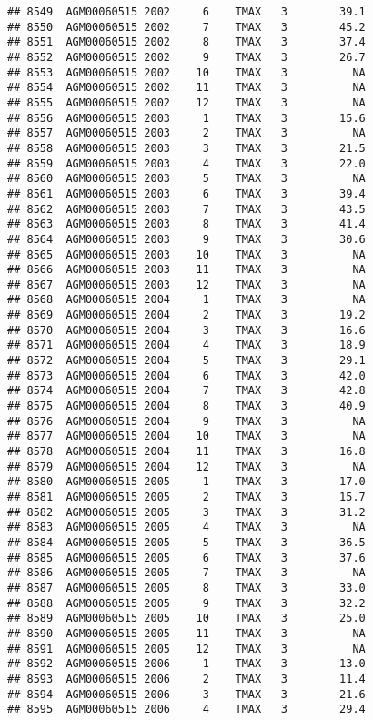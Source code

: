 \documentclass{article}\usepackage[]{graphicx}\usepackage[]{color}
\makeatletter
\newenvironment{kframe}{%
 \def\at@end@of@kframe{}%
 \ifinner\ifhmode%
  \def\at@end@of@kframe{\end{minipage}}%
  \begin{minipage}{\columnwidth}%
 \fi\fi%
 \def\FrameCommand##1{\hskip\@totalleftmargin \hskip-\fboxsep
 \colorbox{shadecolor}{##1}\hskip-\fboxsep
     \hskip-\linewidth \hskip-\@totalleftmargin \hskip\columnwidth}%
 \MakeFramed {\advance\hsize-\width
   \@totalleftmargin\z@ \linewidth\hsize
   \@setminipage}}%
 {\par\unskip\endMakeFramed%
 \at@end@of@kframe}
\newenvironment{knitrout}{}{} %
\makeatother
\begin{document}
\begin{knitrout}
\begin{kframe}
\begin{verbatim}
## 8549  AGM00060515 2002     6    TMAX   3        39.1
## 8550  AGM00060515 2002     7    TMAX   3        45.2
## 8551  AGM00060515 2002     8    TMAX   3        37.4
## 8552  AGM00060515 2002     9    TMAX   3        26.7
## 8553  AGM00060515 2002    10    TMAX   3          NA
## 8554  AGM00060515 2002    11    TMAX   3          NA
## 8555  AGM00060515 2002    12    TMAX   3          NA
## 8556  AGM00060515 2003     1    TMAX   3        15.6
## 8557  AGM00060515 2003     2    TMAX   3          NA
## 8558  AGM00060515 2003     3    TMAX   3        21.5
## 8559  AGM00060515 2003     4    TMAX   3        22.0
## 8560  AGM00060515 2003     5    TMAX   3          NA
## 8561  AGM00060515 2003     6    TMAX   3        39.4
## 8562  AGM00060515 2003     7    TMAX   3        43.5
## 8563  AGM00060515 2003     8    TMAX   3        41.4
## 8564  AGM00060515 2003     9    TMAX   3        30.6
## 8565  AGM00060515 2003    10    TMAX   3          NA
## 8566  AGM00060515 2003    11    TMAX   3          NA
## 8567  AGM00060515 2003    12    TMAX   3          NA
## 8568  AGM00060515 2004     1    TMAX   3          NA
## 8569  AGM00060515 2004     2    TMAX   3        19.2
## 8570  AGM00060515 2004     3    TMAX   3        16.6
## 8571  AGM00060515 2004     4    TMAX   3        18.9
## 8572  AGM00060515 2004     5    TMAX   3        29.1
## 8573  AGM00060515 2004     6    TMAX   3        42.0
## 8574  AGM00060515 2004     7    TMAX   3        42.8
## 8575  AGM00060515 2004     8    TMAX   3        40.9
## 8576  AGM00060515 2004     9    TMAX   3          NA
## 8577  AGM00060515 2004    10    TMAX   3          NA
## 8578  AGM00060515 2004    11    TMAX   3        16.8
## 8579  AGM00060515 2004    12    TMAX   3          NA
## 8580  AGM00060515 2005     1    TMAX   3        17.0
## 8581  AGM00060515 2005     2    TMAX   3        15.7
## 8582  AGM00060515 2005     3    TMAX   3        31.2
## 8583  AGM00060515 2005     4    TMAX   3          NA
## 8584  AGM00060515 2005     5    TMAX   3        36.5
## 8585  AGM00060515 2005     6    TMAX   3        37.6
## 8586  AGM00060515 2005     7    TMAX   3          NA
## 8587  AGM00060515 2005     8    TMAX   3        33.0
## 8588  AGM00060515 2005     9    TMAX   3        32.2
## 8589  AGM00060515 2005    10    TMAX   3        25.0
## 8590  AGM00060515 2005    11    TMAX   3          NA
## 8591  AGM00060515 2005    12    TMAX   3          NA
## 8592  AGM00060515 2006     1    TMAX   3        13.0
## 8593  AGM00060515 2006     2    TMAX   3        11.4
## 8594  AGM00060515 2006     3    TMAX   3        21.6
## 8595  AGM00060515 2006     4    TMAX   3        29.4

\end{verbatim}
\end{kframe}
\end{knitrout}
\end{document}
